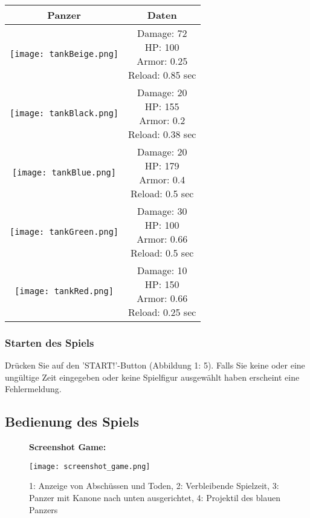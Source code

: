 \documentclass[a4paper]{scrartcl}
\begin{document}
\begin{tabular}{|c|c|}
\hline 
\textbf{Panzer} & \textbf{Daten} \\ 
\hline 
\texttt{[image: tankBeige.png]} & 
\parbox[c]{5cm}{Damage: 72 \\ HP: 100 \\ Armor: 0.25 \\ Reload: 0.85 sec\\}
\\ 
\hline 
\texttt{[image: tankBlack.png]} & \parbox[c]{5cm}{Damage: 20 \\HP: 155 \\  Armor: 0.2 \\ Reload: 0.38 sec\\} \\ 
\hline 
\texttt{[image: tankBlue.png]} & \parbox[c]{5cm}{Damage: 20\\HP: 179 \\  Armor: 0.4\\ Reload: 0.5 sec\\} \\ 
\hline 
\texttt{[image: tankGreen.png]} & \parbox[c]{5cm}{Damage: 30\\HP: 100\\  Armor: 0.66\\ Reload: 0.5 sec\\} \\ 
\hline 
\texttt{[image: tankRed.png]} & \parbox[c]{5cm}{Damage: 10\\HP: 150\\  Armor: 0.66\\ Reload: 0.25 sec\\} \\ 
\hline 
\end{tabular} 

\subsubsection{Starten des Spiels}
Drücken Sie auf den 'START!'-Button (Abbildung 1: 5). Falls Sie keine oder eine ungültige Zeit eingegeben oder keine Spielfigur ausgewählt haben erscheint eine Fehlermeldung.

\newpage
\subsection{Bedienung des Spiels}
\begin{figure}[H]
  \textbf{Screenshot Game:}\par\medskip
  \centering
\texttt{[image: screenshot\_game.png]}    \caption{1: Anzeige von Abschüssen und Toden, 2: Verbleibende Spielzeit, 3: Panzer mit Kanone nach unten ausgerichtet, 4: Projektil des blauen Panzers}
\end{figure}
\end{document}
